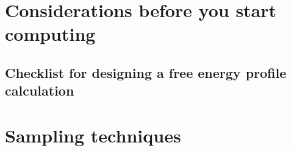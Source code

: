 \documentclass[9pt]{livecoms}
\begin{document}
\section{Considerations before you start computing}



\subsection{Checklist for designing a free energy profile calculation}


\section{Sampling techniques}
\end{document}
